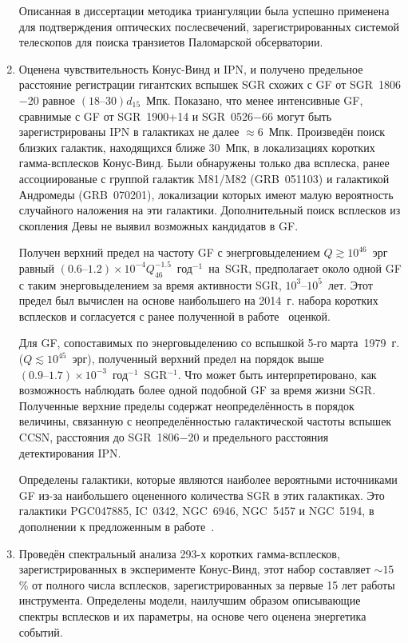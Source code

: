 \begin{enumerate}
    Описанная в диссертации методика триангуляции была успешно применена для 
    подтверждения оптических послесвечений, зарегистрированных системой телескопов 
    для поиска транзиетов Паломарской обсерватории.
    
\item Оценена чувствительность Конус-Винд и IPN, и получено 
    предельное расстояние регистрации гигантских вспышек SGR схожих с GF от SGR~1806$-$20 
    равное $(18\textrm{--}30) d_{15}$~Мпк. Показано, что менее интенсивные GF, сравнимые 
    с GF от SGR~1900+14 и SGR~0526$-$66 могут быть зарегистрированы IPN в галактиках 
    не далее $\approx 6$~Мпк.
    Произведён поиск близких галактик, находящихся ближе 30~Мпк, в локализациях 
    коротких гамма-всплесков Конус-Винд. Были обнаружены только два всплеска, ранее 
    ассоциированые с группой галактик M81/M82 (GRB~051103) и галактикой Андромеды (GRB~070201),
    локализации которых имеют малую вероятность случайного наложения на эти галактики.
    Дополнительный поиск всплесков из скопления Девы не выявил возможных кандидатов в GF.
    
    Получен верхний предел на частоту GF с энегрговыделением $Q \gtrsim 10^{46}$~эрг равный
    ${(0.6\textrm{--}1.2)\times 10^{-4} Q_{46}^{-1.5}}$~год$^{-1}$~на~SGR, предполагает 
    около одной GF с таким энерговыделением за время активности SGR, $10^3\textrm{--}10^5$~лет. 
    Этот предел был вычислен на основе наибольшего на 2014~г.  
    набора коротких всплесков и согласуется с ранее полученной в работе~\citep{Ofek_2007ApJ} оценкой.
    
    Для GF, сопоставимых по энерговыделению со вспышкой 5-го марта~1979~г. ($Q \lesssim 10^{45}$~эрг), 
    полученный верхний предел на порядок выше $(0.9\textrm{--}1.7)\times 10^{-3}$~год$^{-1}$~SGR$^{-1}$. 
    Что может быть интерпретировано, как возможность наблюдать более одной подобной GF за время жизни SGR.
    Полученные верхние пределы содержат неопределённость в порядок величины, связанную с
    неопределённостью галактической частоты вспышек CCSN, расстояния до SGR~1806$-$20 и
    предельного расстояния детектирования IPN.
    
    Определены галактики, которые являются наиболее вероятными источниками GF 
    из-за наибольшего оцененного количества SGR в этих галактиках. Это галактики
    PGC047885, IC~0342, NGC~6946, NGC~5457 и NGC~5194, в дополнении к предложенным 
    в работе~\citep{Popov2006}.
  
\item Проведён спектральный анализа 293-х коротких гамма-всплесков,
    зарегистрированных в эксперименте Конус-Винд, этот набор составляет $\sim 15$\% 
    от полного числа всплесков, зарегистрированных за первые 15 лет работы инструмента.
    Определены модели, наилучшим образом описывающие спектры всплесков и их параметры,
    на основе чего оценена энергетика событий. 
    

\end{enumerate}
